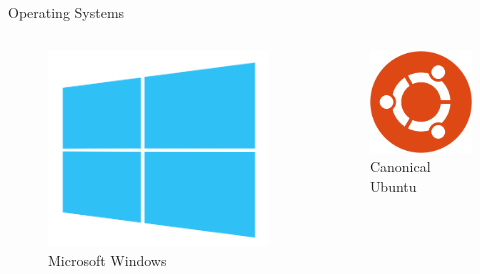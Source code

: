 \documentclass[10pt]{beamer}
\begin{document}
    \begin{frame}{Operating Systems}
        \begin{columns}
            \begin{column}{0.5\textwidth}
                \begin{figure}
                    \includegraphics[height=0.3\paperheight]{images/windows}
                    \caption{Microsoft Windows}
                \end{figure}
            \end{column}
            \begin{column}{0.5\textwidth}
                \begin{figure}
                    \includegraphics[height=0.12\paperheight]{images/ubuntu}
                    \caption{Canonical Ubuntu}

\end{figure}
\end{column}
\end{columns}
\end{frame}
\end{document}
